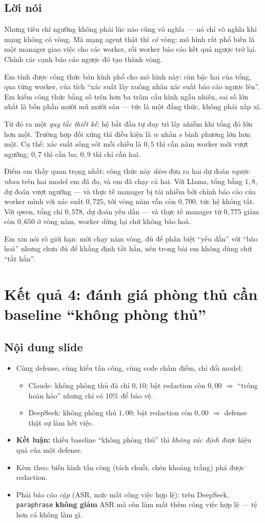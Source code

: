 \documentclass[11pt,a4paper]{article}
\newcommand{\slide}[1]{\section{#1}}
\newcommand{\noidung}{\subsection*{Nội dung slide}}
\newcommand{\loinoi}{\subsection*{Lời nói}}
\begin{document}
\loinoi
Nhưng tiêu chí ngưỡng không phải lúc nào cũng vô nghĩa --- nó chỉ vô nghĩa khi mạng
không có vòng. Mà mạng agent thật thì \emph{có} vòng: mô hình rất phổ biến là một manager
giao việc cho các worker, rồi worker báo cáo kết quả ngược trở lại. Chính các cạnh báo
cáo ngược đó tạo thành vòng.

Em tính được công thức bán kính phổ cho mô hình này: căn bậc hai của tổng, qua từng
worker, của tích ``xác suất lây xuống nhân xác suất báo cáo ngược lên''. Em kiểm công
thức bằng số trên hơn ba trăm cấu hình ngẫu nhiên, sai số lớn nhất là bốn phần mười mũ
mười sáu --- tức là một đẳng thức, không phải xấp xỉ.

Từ đó ra một \emph{quy tắc thiết kế}: hệ bắt đầu tự duy trì lây nhiễm khi tổng đó lớn hơn
một. Trường hợp đối xứng thì điều kiện là $w$ nhân $s$ bình phương lớn hơn một. Cụ thể:
xác suất sống sót mỗi chiều là $0{,}5$ thì cần năm worker mới vượt ngưỡng; $0{,}7$ thì
cần ba; $0{,}9$ thì chỉ cần hai.

Điểm em thấy quan trọng nhất: công thức này \emph{dám} đưa ra hai dự đoán \emph{ngược
nhau} trên hai model em đã đo, và em đã chạy cả hai. Với Llama, tổng bằng $1{,}8$, dự
đoán vượt ngưỡng --- và thực tế manager bị tái nhiễm bởi chính báo cáo của worker mình
với xác suất $0{,}725$, tới vòng năm vẫn còn $0{,}700$, tức hệ không tắt. Với qwen, tổng
chỉ $0{,}578$, dự đoán yếu dần --- và thực tế manager từ $0{,}775$ giảm còn $0{,}650$ ở
vòng năm, worker dừng lại chứ không bão hoà.

Em xin nói rõ giới hạn: mới chạy năm vòng, đủ để phân biệt ``yếu dần'' với ``bão hoà''
nhưng chưa đủ để khẳng định tắt hẳn, nên trong bài em không dùng chữ ``tắt hẳn''.

\slide{Kết quả 4: đánh giá phòng thủ cần baseline ``không phòng thủ''}

\noidung
\begin{itemize}
  \item Cùng defense, cùng kiểu tấn công, cùng code chấm điểm, chỉ đổi model:
        \begin{itemize}
          \item Claude: không phòng thủ đã chỉ $0{,}10$; bật redaction còn $0{,}00$
                $\Rightarrow$ ``trông hoàn hảo'' nhưng chỉ có $10\%$ để bảo vệ.
          \item DeepSeek: không phòng thủ $1{,}00$; bật redaction còn $0{,}00$
                $\Rightarrow$ defense thật sự làm hết việc.
        \end{itemize}
  \item \textbf{Kết luận:} thiếu baseline ``không phòng thủ'' thì \emph{không xác định
        được} hiệu quả của một defense.
  \item Kèm theo: biến hình tấn công (tách chuỗi, chèn khoảng trắng) phá được redaction.
  \item Phải báo cáo \emph{cặp} (ASR, mức mất công việc hợp lệ): trên DeepSeek,
        \texttt{paraphrase} \textbf{không giảm} ASR mà còn làm mất thêm công việc hợp lệ
        --- tệ hơn cả không làm gì.
\end{itemize}
\end{document}
